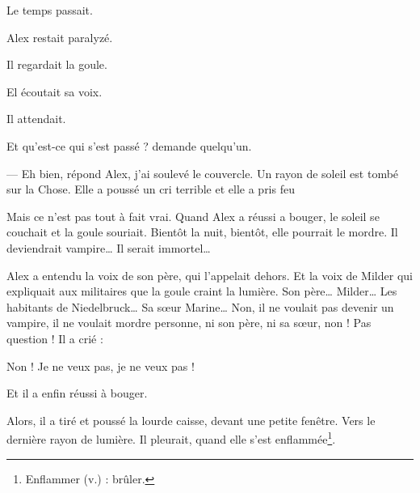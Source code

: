 Le temps passait.

Alex restait paralyzé.

Il regardait la goule.

El écoutait sa voix.

Il attendait.

\og Et qu'est-ce qui s'est passé ? demande quelqu'un.

--- Eh bien, répond Alex, j'ai soulevé le couvercle. Un rayon de soleil est tombé sur la Chose. Elle a poussé un cri terrible et
    elle a pris feu \fg{}

Mais ce n'est pas tout à fait vrai. Quand Alex a réussi a bouger, le soleil se couchait et la goule souriait. Bientôt la nuit,
bientôt, elle pourrait le mordre. Il deviendrait vampire\ldots{} Il serait immortel\ldots{}

Alex a entendu la voix de son père, qui l'appelait dehors. Et la voix de Milder qui expliquait aux militaires que la goule craint
la lumière. Son père\ldots{} Milder\ldots{} Les habitants de Niedelbruck\ldots{} Sa s\oe{}ur Marine\ldots{} Non, il ne voulait pas
devenir un vampire, il ne voulait mordre personne, ni son père, ni sa s\oe{}ur, non ! Pas question ! Il a crié :

\og Non ! Je ne veux pas, je ne veux pas ! \fg{}

Et il a enfin réussi à bouger.

Alors, il a tiré et poussé la lourde caisse, devant une petite fenêtre. Vers le dernière rayon de lumière. Il pleurait, quand elle
s'est enflammée\footnote{Enflammer (v.) : brûler.}.
